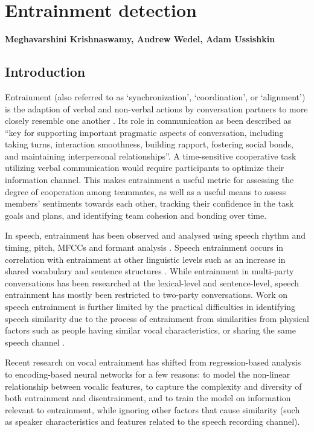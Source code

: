 \chapter{Entrainment detection}
\label{ch:entrainment}

\textbf{Meghavarshini Krishnaswamy, Andrew Wedel, Adam Ussishkin} 
\section{Introduction}

    Entrainment (also referred to as `synchronization', `coordination', or `alignment') is the adaption of verbal and non-verbal actions by conversation partners to more closely resemble one another \parencite{borrie2014}. Its role in communication as been described as ``key for supporting important pragmatic aspects of conversation, including taking turns, interaction smoothness, building rapport, fostering social bonds, and maintaining interpersonal relationships''\parencite{borrie2019}. A time-sensitive cooperative task utilizing verbal communication would require participants to optimize their information channel. This makes entrainment a useful metric for assessing the degree of cooperation among teammates, as well as a useful means to assess members' sentiments towards each other, tracking their confidence in the task goals and plans, and identifying team cohesion and bonding over time.

    In speech, entrainment has been observed and analysed using speech rhythm and
    timing, pitch, MFCCs and formant analysis \parencite{reichel2018prosodic,borrie2019syncing}. Speech entrainment occurs in correlation with entrainment at other linguistic levels such as an increase in shared vocabulary and sentence structures \parencite{rahimi2017entrainment}. While entrainment in multi-party conversations has been researched at the lexical-level and sentence-level, speech entrainment has mostly been restricted to two-party conversations. Work on speech entrainment is further limited by the practical difficulties in identifying speech similarity due to the process of entrainment from similarities from physical factors such as people having similar vocal characteristics, or sharing the same speech channel \parencite{nasir2020}.

    Recent research on vocal entrainment has shifted from regression-based analysis to encoding-based neural networks for a few reasons: to model the non-linear relationship between vocalic features, to capture the complexity and diversity of both entrainment and disentrainment, and to train the model on information relevant to entrainment, while ignoring other factors that cause similarity (such as speaker characteristics and features related to the speech recording channel)\parencite{nasir2020}.


